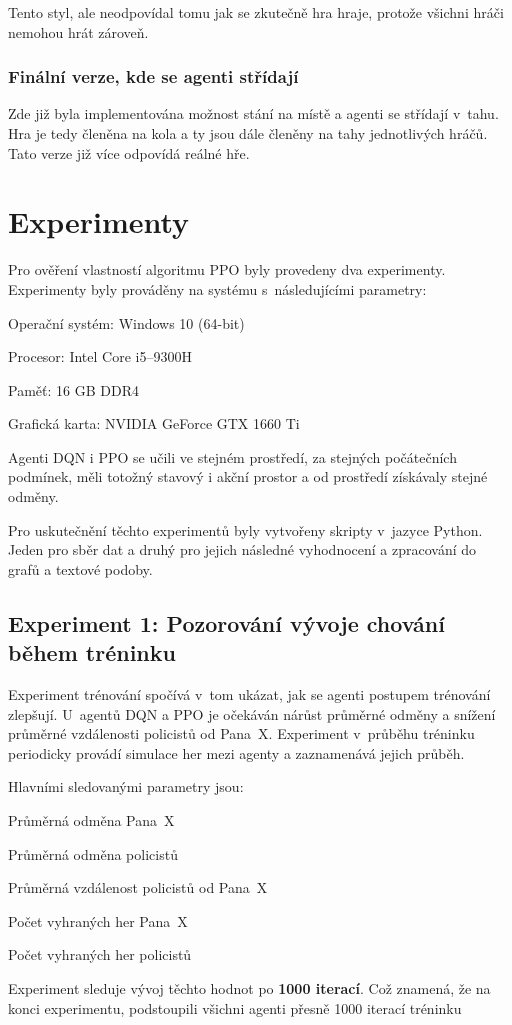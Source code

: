 Tento styl, ale neodpovídal tomu jak se zkutečně hra hraje, protože všichni hráči nemohou hrát zároveň.
\subsection{Finální verze, kde se agenti střídají}
Zde již byla implementována možnost stání na místě a agenti se střídají v~tahu.
Hra je tedy členěna na kola a ty jsou dále členěny na tahy jednotlivých hráčů.
Tato verze již více odpovídá reálné hře.

\chapter{Experimenty}
\label{ch:experimenty}

Pro ověření vlastností algoritmu PPO byly provedeny dva experimenty.
Experimenty byly prováděny na systému s~následujícími parametry:

\begin{myitemize}
  \item Operační systém: Windows 10 (64-bit)
  \item Procesor: Intel Core i5--9300H
  \item Paměť: 16 GB DDR4
  \item Grafická karta: NVIDIA GeForce GTX 1660 Ti
\end{myitemize}

Agenti DQN i PPO se učili ve stejném prostředí, za stejných počátečních podmínek, měli totožný stavový i akční prostor a od prostředí získávaly stejné odměny.

Pro uskutečnění těchto experimentů byly vytvořeny skripty v~jazyce Python.
Jeden pro sběr dat a druhý pro jejich následné vyhodnocení a zpracování do grafů a textové podoby.

\section{Experiment 1: Pozorování vývoje chování během tréninku}
\label{sec:experiment-1}

Experiment trénování spočívá v~tom ukázat, jak se agenti postupem trénování zlepšují.
U~agentů DQN a PPO je očekáván nárůst průměrné odměny a snížení průměrné vzdálenosti policistů od Pana~X\@.
Experiment v~průběhu tréninku periodicky provádí simulace her mezi agenty a zaznamenává jejich průběh.

\bigskip
\noindent Hlavními sledovanými parametry jsou:
\begin{myitemize}
  \item Průměrná odměna Pana~X
  \item Průměrná odměna policistů
  \item Průměrná vzdálenost policistů od Pana~X
  \item Počet vyhraných her Pana~X
  \item Počet vyhraných her policistů
\end{myitemize}
Experiment sleduje vývoj těchto hodnot po \textbf{1000 iterací}.
Což znamená, že na konci experimentu, podstoupili všichni agenti přesně 1000 iterací tréninku

